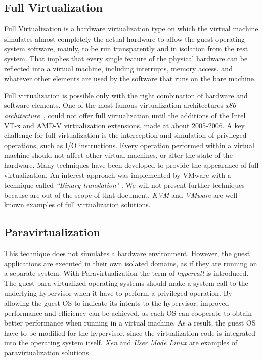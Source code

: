 \subsection{Full Virtualization}

Full Virtualization is a hardware virtualization type on which the virtual
machine simulates almost completely the actual hardware to allow the guest
operating system software, mainly, to be run transparently and in isolation from
the rest system. That implies that every single feature of the physical hardware
can be reflected into a virtual machine, including interrupts, memory access,
and whatever other elements are used by the software that runs on the bare
machine.

Full virtualization is possible only with the right combination of hardware and
software elements. One of the most famous virtualization architectures
\emph{x86 architecture}~\cite{x86}, could not offer full virtualization until
the additions of the Intel VT-x
and AMD-V
virtualization extensions, made at about 2005-2006. A key challenge for full
virtualization is the
interception and simulation of privileged operations, such as I/O instructions.
Every operation performed within a virtual machine should not affect other
virtual machines, or alter the state of the hardware. Many techniques have been
developed to provide the appearance of full virtualization. An interest approach
was implemented by VMware with a technique called \emph{``Binary translation"}
\cite{bin_tran}. We will not present further techniques because are
out of the scope of that document. \emph{KVM} and \emph{VMware} are well-known
examples of full virtualization solutions.

\subsection{Paravirtualization}

This technique does not simulates a hardware environment. However, the guest
applications are executed in their own isolated domains, as if they are running
on a separate system. With Paravirtualization the term of \emph{hypercall} is
introduced. The guest para-virtualized operating systems should make a system
call to the underlying hypervisor when it have to perform a privileged
operation. By allowing the guest OS to indicate its intents to the hypervisor,
improved performance and efficiency can be achieved, as each OS can cooperate to
obtain better performance when running in a virtual machine. As a result, the
guest OS have to be modified for the hypervisor, since the virtualization code
is integrated into the operating system itself. \emph{Xen} and \emph{User Mode
Linux} are examples of paravirtualization solutions.

